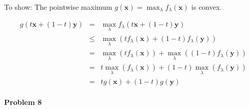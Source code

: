 \documentclass{article}
\renewcommand{\Vec}[1]{\ensuremath{\mathbf{#1}}}
\begin{document}
To show: The pointwise maximum $g(\Vec{x}) = \max_{\lambda}f_{\lambda}(\Vec{x})$ is convex.

\begin{eqnarray}
g(t\Vec{x} + (1-t)\Vec{y}) &=& \max_{\lambda}f_{\lambda}(t\Vec{x} + (1-t)\Vec{y})\\
&\leq& \max_{\lambda}\left( tf_{\lambda}(\Vec{x}) + (1-t)f_{\lambda}(\Vec{y})\right)\\
&=& \max_{\lambda}\left( tf_{\lambda}(\Vec{x})\right) + \max_{\lambda}\left((1-t)f_{\lambda}(\Vec{y})\right)\\
&=& t\max_{\lambda}\left( f_{\lambda}(\Vec{x})\right) + (1-t)\max_{\lambda}\left(f_{\lambda}(\Vec{y})\right)\\
&=& tg(\Vec{x}) + (1-t)g(\Vec{y})
\end{eqnarray}

\paragraph*{Problem 8}
$\;$ 
\end{document}
